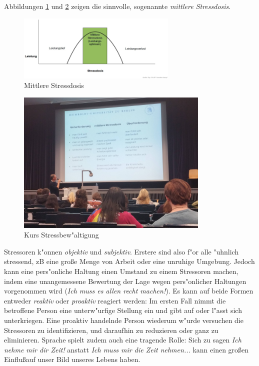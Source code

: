 \documentclass[]{scrartcl}
\begin{document}
Abbildungen \ref{fig:stressdosis} und \ref{fig:stress} zeigen die sinnvolle, sogenannte \emph{mittlere Stressdosis}.

\begin{figure}[h]
	\centering
	\includegraphics[width=0.68\textwidth]{images/studienorga/stressdosis.jpg}
	\caption{Mittlere Stressdosis}
	\label{fig:stressdosis}
\end{figure}


\begin{figure}[h]
	\centering
	\includegraphics[width=0.82\textwidth]{images/studienorga/stress.jpg}
	\caption{Kurs Stressbew"altigung}
	\label{fig:stress}
\end{figure}

Stressoren k"onnen \emph{objektiv} und \emph{subjektiv}. Erstere sind also f"or alle "uhnlich stressend, zB eine große Menge von Arbeit oder eine unruhige Umgebung. Jedoch kann eine pers"onliche Haltung einen Umstand zu einem Stressoren machen, indem eine unangemessene Bewertung der Lage wegen pers"onlicher Haltungen vorgenommen wird (\emph{Ich muss es allen recht machen!}). Es kann auf beide Formen entweder \emph{reaktiv} oder \emph{proaktiv} reagiert werden: Im ersten Fall nimmt die betroffene Person eine unterw"urfige Stellung ein und gibt auf oder l"asst sich unterkriegen. Eine proaktiv handelnde Person wiederum w"urde versuchen die Stressoren zu identifizieren, und daraufhin zu reduzieren oder ganz zu eliminieren. Sprache spielt zudem auch eine tragende Rolle: Sich zu sagen \emph{Ich nehme mir dir Zeit!} anstatt \emph{Ich muss mir die Zeit nehmen...} kann einen gro\ss en Einflu\ss auf unser Bild unseres Lebens haben. 
\end{document}
